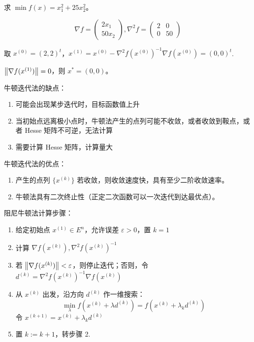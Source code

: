 \begin{example}
    求 $\min f(x) = x_1^2 + 25x_2^2$。

    \answer 
    \[
        \nabla f = \begin{pmatrix}
            2x_1\\ 50x_2
        \end{pmatrix}, 
        \nabla^2f = \begin{pmatrix}
            2 & 0 \\ 0 & 50
        \end{pmatrix}
    \]
    
    取 $x^{(0)} = (2, 2)^t$，$x^{(1)} = x^{(0)} - \nabla^2f(x^{(0)})^{-1}\nabla f(x^{(0)}) = (0, 0)^t$. 
    
    $\norm{\nabla f(x^{(1)})} = 0$，则 $x^* = (0, 0)$。
\end{example}

\begin{note}
    牛顿迭代法的缺点：\begin{enumerate}
        \item 可能会出现某步迭代时，目标函数值上升
        \item 当初始点远离极小点时，牛顿法产生的点列可能不收敛，或者收敛到鞍点，或者 Hesse 矩阵不可逆，无法计算
        \item 需要计算 Hesse 矩阵，计算量大
    \end{enumerate}
    牛顿迭代法的优点：\begin{enumerate}
        \item 产生的点列 $\{x^{(k)}\}$ 若收敛，则收敛速度快，具有至少二阶收敛速率。
        \item 牛顿法具有二次终止性（正定二次函数可以一次迭代到达最优点）。
    \end{enumerate}
\end{note}

\begin{note}
    阻尼牛顿法计算步骤：\begin{enumerate}
        \item 给定初始点 $x^{(1)} \in E^n$，允许误差 $\varepsilon > 0$，置 $k = 1$
        \item 计算 $\nabla f(x^{(k)}), \nabla^2f(x^{(k)})^{-1}$
        \item 若 $\norm{\nabla f(x^{(k)})} < \varepsilon$，则停止迭代；否则，令 $d^{(k)} = \nabla^2f(x^{(k)})^{-1}\nabla f(x^{(k)})$
        \item 从 $x^{(k)}$ 出发，沿方向 $d^{(k)}$ 作一维搜索：\[\min_{\lambda} f(x^{(k)} + \lambda d^{(k)}) = f(x^{(k)} + \lambda_k d^{(k)})\] 令 $x^{(k + 1)} = x^{(k)} + \lambda_k d^{(k)}$
        \item 置 $k := k + 1$，转步骤 2.
    \end{enumerate}
\end{note}

